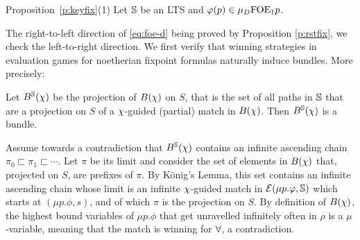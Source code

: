
\begin{proofof}{Proposition~\ref{p:keyfix}(1)}
%    
Let $\mathbb{S}$ be an LTS and $\varphi(p) \in \mu_{D}\mathrm{FOE}_1{p}$. 

The right-to-left direction of \eqref{eq:foe-d} being proved by 
Proposition \ref{p:rstfix}, we check the left-to-right direction.
We first verify that winning strategies in evaluation games for noetherian fixpoint formulas naturally induce bundles. More precisely:


\begin{claim}\label{p:strategybundledEv}
Let $B^{\mathbb{S}}(\chi)$ be the projection of $B(\chi)$ on $S$, that is the set of all paths in $\mathbb{S}$ that are a projection on $S$ of a $\chi$-guided (partial) match in $B(\chi)$. Then $B^{\mathbb{S}}(\chi)$ is a bundle.
\end{claim}
\begin{pfclaim}
Assume towards a contradiction that $B^{\mathbb{S}}(\chi)$ contains an infinite 
ascending chain $\pi_{0} \sqsubset \pi_{1} \sqsubset \cdots$. 
Let $\pi$ be its limit and consider the set of elements in $B(\chi)$ that,
projected on $S$, are prefixes of $\pi$. 
By  K\"{o}nig's Lemma, this set contains an infinite ascending chain whose 
limit is an infinite $\chi$-guided match in $\mathcal{E}(\mu p. \varphi,\mathbb{S})$
which starts at $(\mu p. \phi,s)$, and of which $\pi$ is the projection on $S$.
By definition of $B(\chi)$,  the highest bound variables of $\mu p. \phi$ 
that get unravelled infinitely often in $\rho$ is a $\mu$-variable, meaning that
the match is winning for $\forall$, a contradiction.
\end{pfclaim}


\end{proofof}
